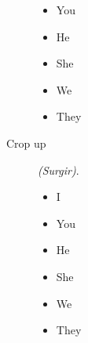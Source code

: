 \begin{multicols}{2}
\begin{description}
\begin{itemize}
  \item You 
  \item He 
  \item She 
  \item We 
  \item They 
  \end{itemize}
\item [Crop up] \emph{(Surgir)}.
  \begin{itemize}
  \item I 
  \item You 
  \item He 
  \item She 
  \item We 
  \item They 
  \end{itemize}
\end{description}
\end{multicols}